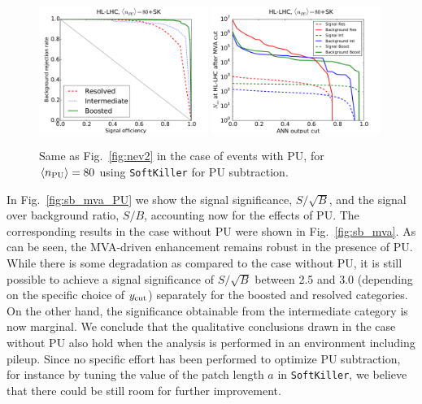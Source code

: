 \begin{figure}[t]
  \begin{center}
    \includegraphics[width=0.49\textwidth]{plots/roc_SKPU80.pdf}
\includegraphics[width=0.49\textwidth]{plots/nev2_SKPU80.pdf}
\caption{\small Same as Fig.~\ref{fig:nev2} in the
case of events with PU, for
$\left\langle n_{\rm PU}\right\rangle=80$ using
{\tt SoftKiller} for PU subtraction.
}
\label{fig:nev2_PU}
\end{center}
\end{figure}


In Fig.~\ref{fig:sb_mva_PU} we show the signal significance,
$S/\sqrt{B}$, and the signal over background ratio,
$S/B$, accounting now for the effects of PU.
%
The corresponding results in the case without PU were shown in
Fig.~\ref{fig:sb_mva}.
%
As can be seen, the MVA-driven enhancement remains robust in the
presence of PU.
%
While
there is some degradation as compared to the case
without PU,
it is still possible to
achieve a signal significance of
 $S/\sqrt{B}$ between 2.5 and 3.0 (depending on the
specific choice of $y_{\rm cut}$)
separately for the boosted and resolved
categories.
%
On the other hand, the significance obtainable from the intermediate category is now marginal.
%
We conclude that the qualitative conclusions drawn
in the case without PU also hold when the analysis
is performed in an environment including pileup.
%
Since no specific effort has been performed to
optimize PU subtraction, for instance by tuning the value
of the patch length $a$ in {\tt SoftKiller}, we believe that
there could be still room for further  improvement.


